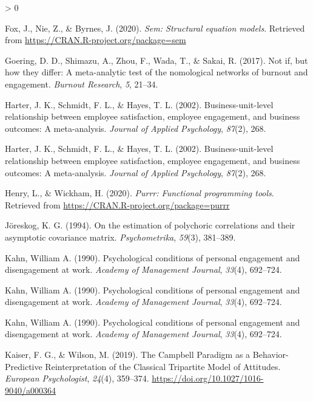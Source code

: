 \documentclass[
  english,
  man]{apa6}
\newlength{\cslhangindent}
\newenvironment{CSLReferences}[2] %
 {%
  \setlength{\parindent}{0pt}
  \ifodd #1 \everypar{\setlength{\hangindent}{\cslhangindent}}\ignorespaces\fi
  \ifnum #2 > 0
  \setlength{\parskip}{#2\baselineskip}
  \fi
 }%
 {}
\begin{document}
\begin{CSLReferences}{1}{0}
\leavevmode\hypertarget{ref-R-sem}{}%
Fox, J., Nie, Z., \& Byrnes, J. (2020). \emph{Sem: Structural equation models}. Retrieved from \url{https://CRAN.R-project.org/package=sem}

\leavevmode\hypertarget{ref-goering2017not}{}%
Goering, D. D., Shimazu, A., Zhou, F., Wada, T., \& Sakai, R. (2017). Not if, but how they differ: A meta-analytic test of the nomological networks of burnout and engagement. \emph{Burnout Research}, \emph{5}, 21--34.

\leavevmode\hypertarget{ref-harter_business-unit-level_2002}{}%
Harter, J. K., Schmidt, F. L., \& Hayes, T. L. (2002). Business-unit-level relationship between employee satisfaction, employee engagement, and business outcomes: A meta-analysis. \emph{Journal of Applied Psychology}, \emph{87}(2), 268.

\leavevmode\hypertarget{ref-harter_business-unit-level_2002}{}%
Harter, J. K., Schmidt, F. L., \& Hayes, T. L. (2002). Business-unit-level relationship between employee satisfaction, employee engagement, and business outcomes: A meta-analysis. \emph{Journal of Applied Psychology}, \emph{87}(2), 268.

\leavevmode\hypertarget{ref-R-purrr}{}%
Henry, L., \& Wickham, H. (2020). \emph{Purrr: Functional programming tools}. Retrieved from \url{https://CRAN.R-project.org/package=purrr}

\leavevmode\hypertarget{ref-joreskog1994estimation}{}%
Jöreskog, K. G. (1994). On the estimation of polychoric correlations and their asymptotic covariance matrix. \emph{Psychometrika}, \emph{59}(3), 381--389.

\leavevmode\hypertarget{ref-kahn_psychological_1990}{}%
Kahn, William A. (1990). Psychological conditions of personal engagement and disengagement at work. \emph{Academy of Management Journal}, \emph{33}(4), 692--724.

\leavevmode\hypertarget{ref-kahn1990psychological}{}%
Kahn, William A. (1990). Psychological conditions of personal engagement and disengagement at work. \emph{Academy of Management Journal}, \emph{33}(4), 692--724.

\leavevmode\hypertarget{ref-kahn_psychological_1990}{}%
Kahn, William A. (1990). Psychological conditions of personal engagement and disengagement at work. \emph{Academy of Management Journal}, \emph{33}(4), 692--724.

\leavevmode\hypertarget{ref-kaiser_campbell_2019}{}%
Kaiser, F. G., \& Wilson, M. (2019). The {Campbell} {Paradigm} as a {Behavior}-{Predictive} {Reinterpretation} of the {Classical} {Tripartite} {Model} of {Attitudes}. \emph{European Psychologist}, \emph{24}(4), 359--374. \url{https://doi.org/10.1027/1016-9040/a000364}


\end{CSLReferences}
\end{document}
